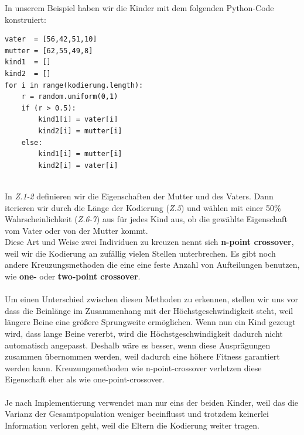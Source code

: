             \newpage
            In unserem Beispiel haben wir die Kinder mit dem folgenden Python-Code konstruiert:
            \hfill \\
            \begin{mdframed}
            \begin{verbatim}
vater  = [56,42,51,10]
mutter = [62,55,49,8]
kind1  = []
kind2  = []
for i in range(kodierung.length):
    r = random.uniform(0,1)
    if (r > 0.5):
        kind1[i] = vater[i]
        kind2[i] = mutter[i]
    else:
        kind1[i] = mutter[i]
        kind2[i] = vater[i]
            \end{verbatim}
            \end{mdframed}
            \hfill \\[4mm]
            \noindent
            In \textit{Z.1-2} definieren wir die Eigenschaften der Mutter und des Vaters. Dann iterieren wir durch die Länge der Kodierung (\textit{Z.5}) und wählen mit einer 50\% Wahrscheinlichkeit (\textit{Z.6-7}) aus für jedes Kind aus, ob die gewählte Eigenschaft vom Vater oder von der Mutter kommt.\\

            \noindent
            Diese Art und Weise zwei Individuen zu kreuzen nennt sich \textbf{n-point crossover}, weil wir die Kodierung an zufällig vielen Stellen unterbrechen. Es gibt noch andere Kreuzungsmethoden die eine eine feste Anzahl von Aufteilungen benutzen, wie \textbf{one-} oder \textbf{two-point crossover}. \\
            \\
            \noindent
            Um einen Unterschied zwischen diesen Methoden zu erkennen, stellen wir uns vor dass die Beinlänge im Zusammenhang mit der Höchstgeschwindigkeit steht, weil längere Beine eine größere Sprungweite ermöglichen. Wenn nun ein Kind gezeugt wird, dass lange Beine vererbt, wird die Höchstgeschwindigkeit dadurch nicht automatisch angepasst. Deshalb wäre es besser, wenn diese Ausprägungen zusammen übernommen werden, weil dadurch eine höhere Fitness garantiert werden kann. Kreuzungsmethoden wie n-point-crossover verletzen diese Eigenschaft eher als wie one-point-crossover.\\
            \\
            \noindent
            Je nach Implementierung verwendet man nur eins der beiden Kinder, weil das die Varianz der Gesamtpopulation weniger beeinflusst und trotzdem keinerlei Information verloren geht, weil die Eltern die Kodierung weiter tragen.

